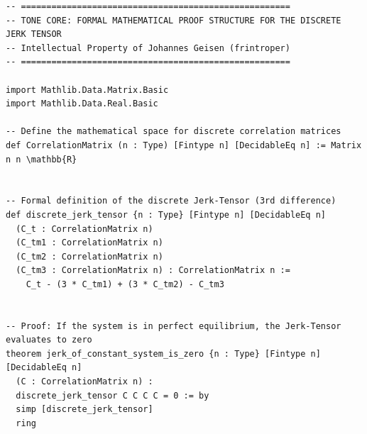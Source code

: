 \documentclass[11pt,a4paper]{article}
\begin{document}
\begin{lstlisting}[basicstyle=\small\ttfamily, breaklines=true, frame=single]
-- =====================================================
-- TONE CORE: FORMAL MATHEMATICAL PROOF STRUCTURE FOR THE DISCRETE JERK TENSOR
-- Intellectual Property of Johannes Geisen (frintroper)
-- =====================================================

import Mathlib.Data.Matrix.Basic
import Mathlib.Data.Real.Basic

-- Define the mathematical space for discrete correlation matrices
def CorrelationMatrix (n : Type) [Fintype n] [DecidableEq n] := Matrix n n \mathbb{R}


-- Formal definition of the discrete Jerk-Tensor (3rd difference)
def discrete_jerk_tensor {n : Type} [Fintype n] [DecidableEq n] 
  (C_t : CorrelationMatrix n) 
  (C_tm1 : CorrelationMatrix n) 
  (C_tm2 : CorrelationMatrix n) 
  (C_tm3 : CorrelationMatrix n) : CorrelationMatrix n :=
    C_t - (3 * C_tm1) + (3 * C_tm2) - C_tm3


-- Proof: If the system is in perfect equilibrium, the Jerk-Tensor evaluates to zero
theorem jerk_of_constant_system_is_zero {n : Type} [Fintype n] [DecidableEq n] 
  (C : CorrelationMatrix n) : 
  discrete_jerk_tensor C C C C = 0 := by
  simp [discrete_jerk_tensor]
  ring
\end{lstlisting}
\end{document}
